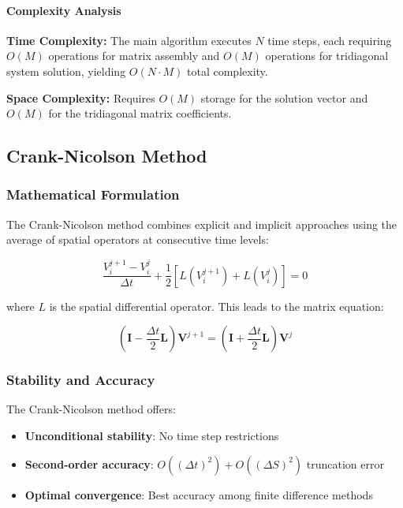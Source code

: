 \documentclass[12pt,a4paper]{article}
\numberwithin{algorithm}{subsection}
\begin{document}
\paragraph{Complexity Analysis}

\textbf{Time Complexity:} The main algorithm executes $N$ time steps, each requiring $O(M)$ operations for matrix assembly and $O(M)$ operations for tridiagonal system solution, yielding $O(N \cdot M)$ total complexity.

\textbf{Space Complexity:} Requires $O(M)$ storage for the solution vector and $O(M)$ for the tridiagonal matrix coefficients.

\subsection{Crank-Nicolson Method}

\subsubsection{Mathematical Formulation}

The Crank-Nicolson method combines explicit and implicit approaches using the average of spatial operators at consecutive time levels:

\begin{equation}
\frac{V_i^{j+1} - V_i^j}{\Delta t} + \frac{1}{2} \left[ L(V_i^{j+1}) + L(V_i^j) \right] = 0
\end{equation}

where $L$ is the spatial differential operator. This leads to the matrix equation:

\begin{equation}
(\mathbf{I} - \frac{\Delta t}{2}\mathbf{L}) \mathbf{V}^{j+1} = (\mathbf{I} + \frac{\Delta t}{2}\mathbf{L}) \mathbf{V}^j
\end{equation}

\subsubsection{Stability and Accuracy}

The Crank-Nicolson method offers:
\begin{itemize}
\item \textbf{Unconditional stability}: No time step restrictions
\item \textbf{Second-order accuracy}: $O((\Delta t)^2) + O((\Delta S)^2)$ truncation error
\item \textbf{Optimal convergence}: Best accuracy among finite difference methods
\end{itemize}
\end{document}

